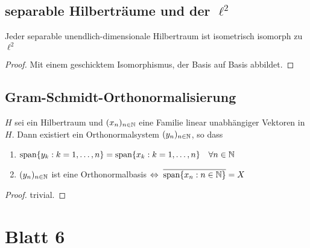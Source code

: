 \documentclass[FunkAnaskriptSS2017.tex]{subfiles}
\begin{document}
\subsection{ separable Hilberträume und der $\ell ^2$}
\label{B5.2}
	Jeder separable unendlich-dimensionale Hilbertraum ist isometrisch isomorph zu $\ell^2$
	\begin{proof}
		Mit einem geschicktem Isomorphismus, der Basis auf Basis abbildet.
	\end{proof}
	
\subsection{ Gram-Schmidt-Orthonormalisierung}
\label{B5.3}
	$H$ sei ein Hilbertraum und $(x_n)_{n\in \mathbb{N}}$ eine Familie linear unabhängiger Vektoren in $H$. Dann existiert ein Orthonormalsystem $(y_n)_{n\in \mathbb{N}}$, so dass
	\begin{enumerate}
		\item $\textnormal{span} \{ y_k : k = 1, \dots, n \} = \textnormal{span} \{ x_k : k = 1,\dots , n\} \quad \forall n\in \mathbb{N}$
		\item $(y_n)_{n\in\mathbb{N}}$ ist eine Orthonormalbasis $\Leftrightarrow \; \overline{\textnormal{span} \{ x_n : n\in\mathbb{N}\} } = X$
	\end{enumerate}
	
	\begin{proof}
		trivial.
	\end{proof}
	
	
	
\newpage
\section{Blatt 6}

\end{document}
